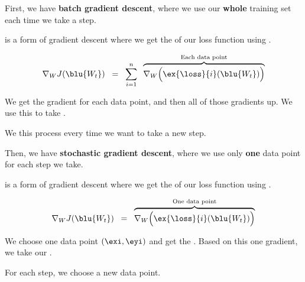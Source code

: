             First, we have \textbf{batch gradient descent}, where we use our \textbf{whole} training set each time we take a step.\\
            
            \begin{definition}
                 is a form of gradient descent where we get the  of our loss function using .
                
                \begin{equation*}
                    \nabla_W J ( \blu{ W_t } )
                    \;\;=\;\;
                    \sum_{i=1}^n
                    \;\;
                    \overbrace{
                        \nabla_W
                        \Big(
                            \ex{\loss}{i}(\blu{ W_t })
                        \Big)
                    }^{\text{Each data point}}
                \end{equation*}
                
                We get the gradient for each data point, and then  all of those gradients up. We use this  to take .
                
                We  this process every time we want to take a new step.
            \end{definition}
            
            Then, we have \textbf{stochastic gradient descent}, where we use only \textbf{one} data point for each step we take.\\
            
            \begin{definition}
                 is a form of gradient descent where we get the  of our loss function using .
                
                \begin{equation*}
                    \nabla_W J ( \blu{ W_t } )
                    \;\;
                    =
                    \;\;
                    \overbrace{
                    \nabla_W
                    \Big(
                        \ex{\loss}{i}(\blu{ W_t })
                    \Big)
                    }^{\text{One data point}}
                \end{equation*}
                
                We  choose one data point $(\exi,\eyi)$ and get the . Based on this one gradient, we take our .
                
                For each step, we choose a new  data point.
            \end{definition}
            
